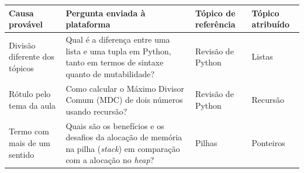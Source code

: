 \begin{quadro}[H]\captionsetup{name=Quadro}
\centering
\caption{Exemplos de divergências na classificação das perguntas}
\label{quad:divergencias-classificacao}

\renewcommand{\arraystretch}{1.3}
\setlength{\tabcolsep}{3pt}

\begin{tabularx}{\textwidth}{
|>{\raggedright\arraybackslash}p{2.5cm}
|>{\raggedright\arraybackslash}X
|>{\raggedright\arraybackslash}p{2.2cm}
|>{\raggedright\arraybackslash}p{2.0cm}|
}
\hline

\rowcolor[HTML]{C0C0C0}
\textbf{Causa provável} &
\textbf{Pergunta enviada à plataforma} &
\textbf{Tópico de referência} &
\textbf{Tópico atribuído} \\ \hline

Divisão diferente dos tópicos &
Qual é a diferença entre uma lista e uma tupla em Python, tanto em termos de sintaxe quanto de mutabilidade? &
Revisão de Python &
Listas \\ \hline

Rótulo pelo tema da aula &
Como calcular o Máximo Divisor Comum (MDC) de dois números usando recursão? &
Revisão de Python &
Recursão \\ \hline

Termo com mais de um sentido &
Quais são os benefícios e os desafios da alocação de memória na pilha (\textit{stack}) em comparação com a alocação no \textit{heap}? &
Pilhas &
Ponteiros \\ \hline

\end{tabularx}

{\fontsize{10pt}{12pt}\selectfont
\caption*{Fonte: Elaborado pela autora (2026).}
}
\end{quadro}

\FloatBarrier


\FloatBarrier


